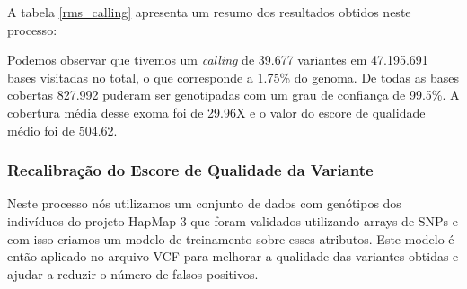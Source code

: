 A tabela \ref{rms_calling} apresenta um resumo dos resultados obtidos neste processo:


Podemos observar que tivemos um \textit{calling} de 39.677 variantes em 47.195.691 bases visitadas no total, o que corresponde a 1.75\% do genoma. De todas as bases cobertas 827.992 puderam ser genotipadas com um grau de confiança de 99.5\%. A cobertura média desse exoma foi de 29.96X e o valor do escore de qualidade médio foi de 504.62.

\subsubsection{Recalibração do Escore de Qualidade da Variante}

Neste processo nós utilizamos um conjunto de dados com genótipos dos indivíduos do projeto HapMap 3 que foram validados utilizando arrays de SNPs e com isso criamos um modelo de treinamento sobre esses atributos. Este modelo é então aplicado no arquivo VCF para melhorar a qualidade das variantes obtidas e ajudar a reduzir o número de falsos positivos.

